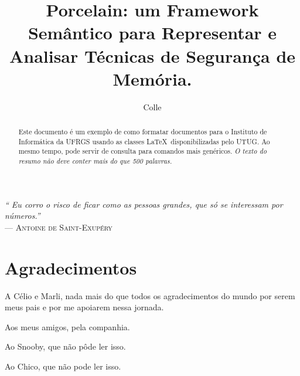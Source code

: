 \documentclass[cic,tc]{iiufrgs}
\title{Porcelain: um Framework Semântico para Representar e Analisar Técnicas de Segurança de Memória.}
\author{Colle}{Pedro Henrique Boniatti}
\begin{document}


\maketitle

 \clearpage
 \begin{flushright}
     \mbox{}\vfill
     {\sffamily\itshape
       ``
       Eu corro o risco de ficar como as pessoas grandes, 
	   que só se interessam por números.''\\
     }
     --- \textsc{Antoine de Saint-Exupéry}
 \end{flushright}

\chapter*{Agradecimentos}
A Célio e Marli, nada mais do que todos os agradecimentos 
do mundo por serem meus pais e por me apoiarem nessa jornada. 

Aos meus amigos, pela companhia.

Ao Snooby, que não pôde ler isso.

Ao Chico, que não pode ler isso.


\begin{abstract}
    Este documento é um exemplo de como formatar documentos para o
    Instituto de Informática da UFRGS usando as classes \LaTeX\
    disponibilizadas pelo UTUG\@. Ao mesmo tempo, pode servir de consulta
    para comandos mais genéricos. \emph{O texto do resumo não deve
        conter mais do que 500 palavras.}
\end{abstract}
\end{document}
